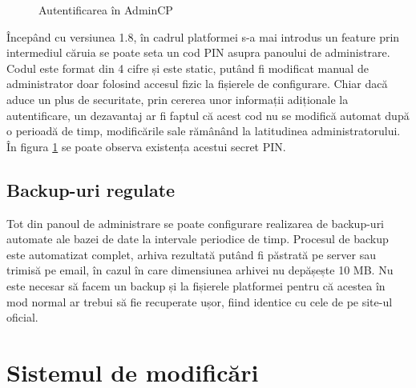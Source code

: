\begin{figure}
    \vspace{-60pt}
    \vspace{-20pt}
    \caption{\label{fig:Policy-AdminLogin} Autentificarea în AdminCP}
    \vspace{-10pt}
\end{figure}

Începând cu versiunea 1.8, în cadrul platformei s-a mai introdus un feature prin intermediul căruia se poate seta un cod PIN asupra panoului de administrare. Codul este format din 4 cifre și este static, putând fi modificat manual de administrator doar folosind accesul fizic la fișierele de configurare. Chiar dacă aduce un plus de securitate, prin cererea unor informații adiționale la autentificare, un dezavantaj ar fi faptul că acest cod nu se modifică automat după o perioadă de timp, modificările sale rămânând la latitudinea administratorului. În figura \ref{fig:Policy-AdminLogin} se poate observa existența acestui secret PIN.

\subsection{Backup-uri regulate}

Tot din panoul de administrare se poate configurare realizarea de backup-uri automate ale bazei de date la intervale periodice de timp. Procesul de backup este automatizat complet, arhiva rezultată putând fi păstrată pe server sau trimisă pe email, în cazul în care dimensiunea arhivei nu depășește 10 MB. Nu este necesar să facem un backup și la fișierele platformei pentru că acestea în mod normal ar trebui să fie recuperate ușor, fiind identice cu cele de pe site-ul oficial.

\section{Sistemul de modificări}

